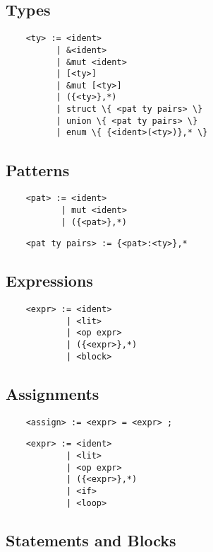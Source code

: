\documentclass[a4paper]{article}
\begin{document}
\subsection{Types}

\begin{verbatim}
    <ty> := <ident>
          | &<ident>
          | &mut <ident>
          | [<ty>]
          | &mut [<ty>]
          | ({<ty>},*)
          | struct \{ <pat ty pairs> \}
          | union \{ <pat ty pairs> \}
          | enum \{ {<ident>(<ty>)},* \}
\end{verbatim}

\subsection{Patterns}

\begin{verbatim}
    <pat> := <ident>
           | mut <ident>
           | ({<pat>},*)
\end{verbatim}

\begin{verbatim}
    <pat ty pairs> := {<pat>:<ty>},*
\end{verbatim}

\subsection{Expressions}

\begin{verbatim}
    <expr> := <ident>
            | <lit>
            | <op expr>
            | ({<expr>},*)
            | <block>
\end{verbatim}

\subsection{Assignments}

\begin{verbatim}
    <assign> := <expr> = <expr> ;
\end{verbatim}

\begin{verbatim}
    <expr> := <ident>
            | <lit>
            | <op expr>
            | ({<expr>},*)
            | <if>
            | <loop>
\end{verbatim}

\subsection{Statements and Blocks}
\end{document}

